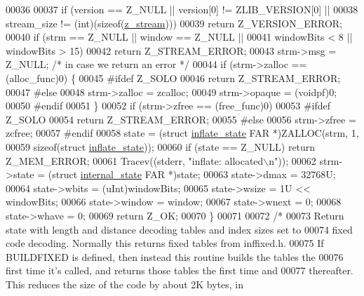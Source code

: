 \begin{DoxyCode}
00036 
00037     \textcolor{keywordflow}{if} (version == Z\_NULL || version[0] != ZLIB\_VERSION[0] ||
00038         stream\_size != (\textcolor{keywordtype}{int})(\textcolor{keyword}{sizeof}(\hyperlink{structz__stream__s}{z\_stream})))
00039         \textcolor{keywordflow}{return} Z\_VERSION\_ERROR;
00040     \textcolor{keywordflow}{if} (strm == Z\_NULL || window == Z\_NULL ||
00041         windowBits < 8 || windowBits > 15)
00042         \textcolor{keywordflow}{return} Z\_STREAM\_ERROR;
00043     strm->msg = Z\_NULL;                 \textcolor{comment}{/* in case we return an error */}
00044     \textcolor{keywordflow}{if} (strm->zalloc == (alloc\_func)0) \{
00045 \textcolor{preprocessor}{#ifdef Z\_SOLO}
00046         \textcolor{keywordflow}{return} Z\_STREAM\_ERROR;
00047 \textcolor{preprocessor}{#else}
00048         strm->zalloc = zcalloc;
00049         strm->opaque = (voidpf)0;
00050 \textcolor{preprocessor}{#endif}
00051     \}
00052     \textcolor{keywordflow}{if} (strm->zfree == (free\_func)0)
00053 #ifdef Z\_SOLO
00054         \textcolor{keywordflow}{return} Z\_STREAM\_ERROR;
00055 \textcolor{preprocessor}{#else}
00056     strm->zfree = zcfree;
00057 \textcolor{preprocessor}{#endif}
00058     state = (\textcolor{keyword}{struct }\hyperlink{structinflate__state}{inflate\_state} FAR *)ZALLOC(strm, 1,
00059                                                \textcolor{keyword}{sizeof}(\textcolor{keyword}{struct} \hyperlink{structinflate__state}{inflate\_state}));
00060     \textcolor{keywordflow}{if} (state == Z\_NULL) \textcolor{keywordflow}{return} Z\_MEM\_ERROR;
00061     Tracev((stderr, \textcolor{stringliteral}{"inflate: allocated\(\backslash\)n"}));
00062     strm->state = (\textcolor{keyword}{struct }\hyperlink{structinternal__state}{internal\_state} FAR *)state;
00063     state->dmax = 32768U;
00064     state->wbits = (uInt)windowBits;
00065     state->wsize = 1U << windowBits;
00066     state->window = window;
00067     state->wnext = 0;
00068     state->whave = 0;
00069     \textcolor{keywordflow}{return} Z\_OK;
00070 \}
00071 
00072 \textcolor{comment}{/*}
00073 \textcolor{comment}{   Return state with length and distance decoding tables and index sizes set to}
00074 \textcolor{comment}{   fixed code decoding.  Normally this returns fixed tables from inffixed.h.}
00075 \textcolor{comment}{   If BUILDFIXED is defined, then instead this routine builds the tables the}
00076 \textcolor{comment}{   first time it's called, and returns those tables the first time and}
00077 \textcolor{comment}{   thereafter.  This reduces the size of the code by about 2K bytes, in}

\end{DoxyCode}
